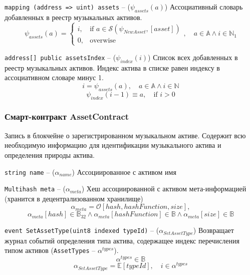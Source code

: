 \documentclass[12pt]{report}
\def\code#1{\colorbox{light-gray}{\texttt{#1}}}
\begin{document}
\code{mapping (address => uint) assets} – ($\psi_{assets}(a)$)\hfill\null\linebreak
Ассоциативный словарь добавленных в реестр музыкальных активов.
\begin{equation}
\psi_{assets}(a) = \begin{cases}
	i, & \text{if } a \in \mathcal{S}(\psi_{NewAsset}, [{asset}]) \\
	0, & \text{overwise}
\end{cases}, \quad a \in \mathbb{A} \wedge i \in \mathbb{N}_1
\end{equation}

\code{address[] public assetsIndex} – ($\psi_{index}(i)$)\hfill\null\linebreak
Список всех добавленных в реестр музыкальных активов. Индекс актива в списке равен индексу в ассоциативном словаре минус 1.
\begin{equation}
i = \psi_{assets}(a), \quad a \in \mathbb{A} \wedge i \in \mathbb{N}
\end{equation}
\begin{equation}
\psi_{index}(i - 1) \equiv a, \quad \text{if } i > 0
\end{equation}

\subsubsection{Смарт-контракт AssetContract}
\label{tech-apps-assets-contract}
Запись в блокчейне о зарегистрированном музыкальном активе. Содержит всю необходимую информацию для идентификации музыкального актива и определения природы актива.

\code{string name} – ($\alpha_{name}$)\hfill\null\linebreak
Ассоциированное с активом имя

\code{Multihash meta} – ($\alpha_{meta}$)\hfill\null\linebreak
Хеш ассоциированной с активом мета-информацией (хранится в децентрализованном хранилище)
\begin{equation}
\alpha_{meta} = \mathcal{O}[hash, hashFunction, size],
\end{equation}
\begin{equation}
\alpha_{meta}[hash] \in \mathbb{B}_{32} \wedge \alpha_{meta}[hashFunction] \in \mathbb{B} \wedge \alpha_{meta}[size] \in \mathbb{B}
\end{equation}

\code{event SetAssetType(uint8 indexed typeId)} – ($\alpha_{SetAssetType}$)\hfill\null\linebreak
Возвращает журнал событий определения типа актива, содержащее 	индекс перечисления типом активов (\code{AssetTypes} – $\alpha^{types}$).
\begin{equation}
\alpha^{types} \in \mathbb{B}
\end{equation}
\begin{equation}
\alpha_{SetAssetType} = \mathbb{E}[typeId], \quad i \in \alpha^{types}
\end{equation}
\end{document}
